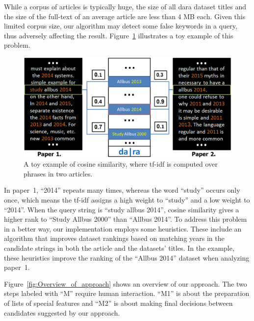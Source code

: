 \documentclass{IOS-Book-Article}
\newcommand{\dara}{\textsf{da\textbar ra}}
\begin{document}
While a corpus of articles is typically huge, the size of all {\dara} dataset titles and the size of the full-text of an average article are less than 4 MB each.
Given this limited corpus size, our algorithm may detect some false keywords in a query, thus adversely affecting the result.
Figure~\ref{fig:similarity-example} illustrates a toy example of this problem.

\begin{figure}[h]
	\centering
	\includegraphics[width=4.5 in]{ToyExamplE.PNG} 
	\caption{A toy example of cosine similarity, where tf-idf is computed over phrases in two articles.}
	\label{fig:similarity-example}
\end{figure}

In paper~1, \enquote{2014} repeats many times, whereas the word \enquote{study} occurs only once, which means the tf-idf assigns a high weight to \enquote{study} and a low weight to \enquote{2014}. When the query string is \enquote{study allbus 2014}, cosine similarity gives a higher rank to \enquote{Study Allbus 2000} than \enquote{Allbus 2014}.
To address this problem in a better way, our implementation employs some heuristics.
These include an algorithm that improves dataset rankings based on matching years in the candidate strings in both the article and the datasets' titles.
In the example, these heuristics improve the ranking of the \enquote{Allbus 2014} dataset when analyzing paper~1. 

Figure~\ref{fig:Overview_of_approach} shows an overview of our approach.
The two steps labeled with \enquote{M} require human interaction.
\enquote{M1} is about the preparation of lists of special features and \enquote{M2} is about making final decisions between candidates suggested by our approach.
\end{document}
